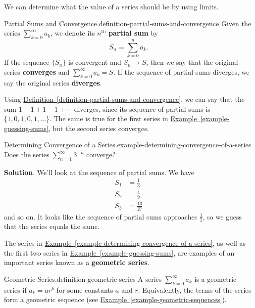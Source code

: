 \documentclass[10pt,]{book}
\newcommand{\terminology}[1]{\textbf{#1}}
\numberwithin{equation}{section}
\newcommand{\amp}{&}
\begin{document}
\hypertarget{p-833}{}%
We can determine what the value of a series should be by using limits.%
\begin{definition}{Partial Sums and Convergence.}{definition-partial-sums-and-convergence}%
\hypertarget{p-834}{}%
Given the series \(\sum_{k=0}^{\infty}a_{k}\), we denote its \(n^{\text{th}}\) \terminology{partial sum} by%
\begin{equation*}
S_{n} = \sum_{k=0}^{n}a_{k}\text{.}
\end{equation*}
If the sequence \(\{S_{n}\}\) is convergent and \(S_{n}\to S\), then we say that the original series \terminology{converges} and \(\sum_{k=0}^{\infty}a_{k} = S\). If the sequence of partial sums diverges, we say the original series \terminology{diverges}.%
\end{definition}
\hypertarget{p-835}{}%
Using \hyperref[definition-partial-sums-and-convergence]{Definition~\ref{definition-partial-sums-and-convergence}}, we can say that the sum \(1 - 1 + 1 - 1 + \cdots\) diverges, since its sequence of partial sums is \(\{1,0,1,0,1,\ldots\}\). The same is true for the first series in \hyperref[example-guessing-sums]{Example~\ref{example-guessing-sums}}, but the second series converges.%
\begin{example}{Determining Convergence of a Series.}{example-determining-convergence-of-a-series}%
\hypertarget{p-836}{}%
Does the series \(\sum_{n=1}^{\infty}3^{-n}\) converge?%
\par\smallskip%
\noindent\textbf{Solution}.\hypertarget{solution-172}{}\quad%
\hypertarget{p-837}{}%
We'll look at the sequence of partial sums. We have%
\begin{align*}
S_{1} \amp = \frac{1}{3} \\
S_{2} \amp = \frac{4}{9} \\
S_{3} \amp = \frac{13}{27} 
\end{align*}
and so on. It looks like the sequence of partial sums approaches \(\frac{1}{2}\), so we guess that the series equals the same.%
\end{example}
\hypertarget{p-838}{}%
The series in \hyperref[example-determining-convergence-of-a-series]{Example~\ref{example-determining-convergence-of-a-series}}, as well as the first two series in \hyperref[example-guessing-sums]{Example~\ref{example-guessing-sums}}, are examples of an important series known as a \terminology{geometric series}.%
\begin{definition}{Geometric Series.}{definition-geometric-series}%
\hypertarget{p-839}{}%
A series \(\sum_{k=0}^{\infty}a_{k}\) is a geometric series if \(a_{k} = ar^{k}\) for some constants \(a\) and \(r\). Equivalently, the terms of the series form a geometric sequence (see \hyperref[example-geometric-sequences]{Example~\ref{example-geometric-sequences}}).%
\end{definition}
\end{document}
